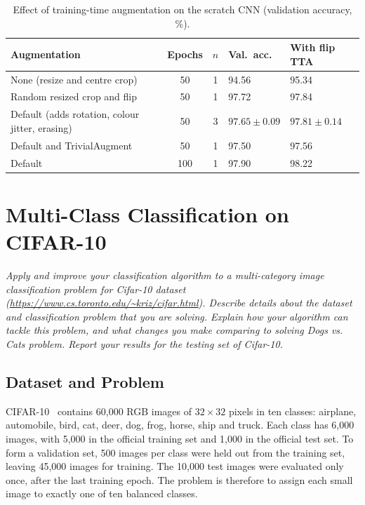 \documentclass[11pt,a4paper]{article}
\newenvironment{question}
  {\par\smallskip\noindent\begin{lrbox}{\questionbox}%
   \begin{minipage}{\dimexpr\linewidth-2\fboxsep-2\fboxrule\relax}\small\itshape}
  {\end{minipage}\end{lrbox}%
   \fcolorbox{gray!45}{gray!7}{\usebox{\questionbox}}\par\smallskip}
\begin{document}
\begin{table}[ht]
  \centering
  \small
  \caption{Effect of training-time augmentation on the scratch CNN (validation accuracy, \%).}
  \label{tab:augmentation}
  \begin{tabular}{@{}lccll@{}}
    \toprule
    Augmentation & Epochs & $n$ & Val.\ acc. & With flip TTA \\
    \midrule
    None (resize and centre crop)                    &  50 & 1 & 94.56 & 95.34 \\
    Random resized crop and flip                     &  50 & 1 & 97.72 & 97.84 \\
    Default (adds rotation, colour jitter, erasing)   &  50 & 3 & $97.65 \pm 0.09$ & $97.81 \pm 0.14$ \\
    Default and TrivialAugment                       &  50 & 1 & 97.50 & 97.56 \\
    Default                                          & 100 & 1 & 97.90 & 98.22 \\
    \bottomrule
  \end{tabular}
\end{table}

\setcounter{topnumber}{3}
\renewcommand{\topfraction}{0.9}

\section{Multi-Class Classification on CIFAR-10}\label{sec:g}

\begin{question}
Apply and improve your classification algorithm to a multi-category image classification problem for Cifar-10 dataset (\url{https://www.cs.toronto.edu/~kriz/cifar.html}). Describe details about the dataset and classification problem that you are solving. Explain how your algorithm can tackle this problem, and what changes you make comparing to solving Dogs vs. Cats problem. Report your results for the testing set of Cifar-10.
\end{question}

\subsection*{Dataset and Problem}

CIFAR-10~\cite{krizhevsky2009cifar} contains 60,000 RGB images of $32 \times 32$ pixels in ten classes: airplane, automobile, bird, cat, deer, dog, frog, horse, ship and truck. Each class has 6,000 images, with 5,000 in the official training set and 1,000 in the official test set. To form a validation set, 500 images per class were held out from the training set, leaving 45,000 images for training. The 10,000 test images were evaluated only once, after the last training epoch. The problem is therefore to assign each small image to exactly one of ten balanced classes.
\end{document}
